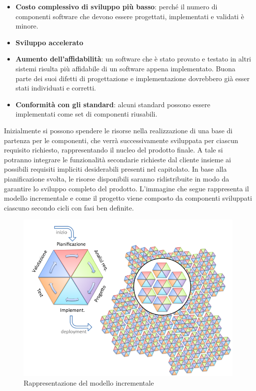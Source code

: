 \begin{itemize}
\begin{itemize}
			\item \textbf{Costo complessivo di sviluppo più basso}: perché il numero di componenti software che devono essere progettati, implementati e validati è minore.
			\item \textbf{Sviluppo accelerato}
			\item \textbf{Aumento dell'affidabilità}: un software che è stato provato e testato in altri sistemi risulta più affidabile di un software appena implementato.
			Buona parte dei suoi difetti di progettazione e implementazione dovrebbero già esser stati individuati e corretti.
			\item \textbf{Conformità con gli standard}: alcuni standard
			possono essere implementati come set di componenti riusabili.
		\end{itemize}
	\end{itemize}
	Inizialmente si possono spendere le risorse nella realizzazione di una base di partenza per le componenti, che verrà successivamente sviluppata per ciascun requisito richiesto, rappresentando il nucleo del prodotto finale.
	A tale  si potranno integrare le funzionalità secondarie richieste dal cliente insieme ai possibili requisiti impliciti desiderabili presenti nel capitolato. In base alla pianificazione svolta, le risorse disponibili saranno ridistribuite in modo da garantire lo sviluppo completo del prodotto.
	L'immagine che segue rappresenta il modello incrementale e come il progetto viene composto da componenti sviluppati ciascuno secondo cicli con fasi ben definite.
	\begin{figure}[H]
		\centering
		\includegraphics[scale=0.5]{img/modello_incrementale.png}
		\caption{Rappresentazione del modello incrementale\protect\footnotemark}
		\label{fig:modello_incrementale}
	\end{figure}

	